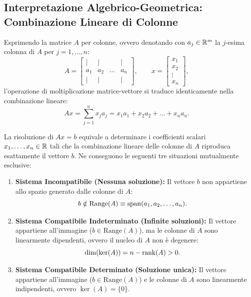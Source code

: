 \subsection{Interpretazione Algebrico-Geometrica: Combinazione Lineare di Colonne}
Esprimendo la matrice $A$ per colonne, ovvero denotando con $a_j \in \mathbb{R}^m$ la $j$-esima colonna di $A$ per $j = 1, \dots, n$:
\begin{equation}
    A = \begin{bmatrix}
        \vert & \vert & & \vert \\
        a_1 & a_2 & \dots & a_n \\
        \vert & \vert & & \vert
    \end{bmatrix}, \qquad
    x = \begin{bmatrix}
        x_1 \\ x_2 \\ \vdots \\ x_n
    \end{bmatrix},
\end{equation}
l'operazione di moltiplicazione matrice-vettore si traduce identicamente nella combinazione lineare:
\begin{equation}
    Ax = \sum_{j=1}^n x_j a_j = x_1 a_1 + x_2 a_2 + \dots + x_n a_n.
    \label{eq:combinazione-lineare-colonne}
\end{equation}

\begin{property}
La risoluzione di $Ax = b$ equivale a determinare i coefficienti scalari $x_1, \dots, x_n \in \mathbb{R}$ tali che la combinazione lineare delle colonne di $A$ riproduca esattamente il vettore $b$. Ne conseguono le seguenti tre situazioni mutualmente esclusive:
\begin{enumerate}
    \item \textbf{Sistema Incompatibile (Nessuna soluzione):} Il vettore $b$ non appartiene allo spazio generato dalle colonne di $A$:
    \begin{equation}
        b \notin \mathrm{Range}(A) \equiv \operatorname{span}(a_1, a_2, \dots, a_n).
    \end{equation}
    \item \textbf{Sistema Compatibile Indeterminato (Infinite soluzioni):} Il vettore appartiene all'immagine ($b \in \mathrm{Range}(A)$), ma le colonne di $A$ sono linearmente dipendenti, ovvero il nucleo di $A$ non \`e degenere:
    \begin{equation}
        \dim(\ker(A)) = n - \operatorname{rank}(A) > 0.
    \end{equation}
    \item \textbf{Sistema Compatibile Determinato (Soluzione unica):} Il vettore appartiene all'immagine ($b \in \mathrm{Range}(A)$) e le colonne di $A$ sono linearmente indipendenti, ovvero $\ker(A) = \{0\}$.
\end{enumerate}
\end{property}

